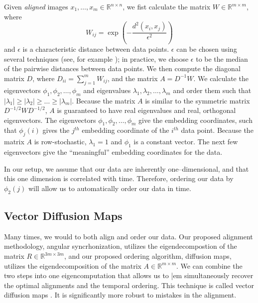 \documentclass[12pt]{article}
\begin{document}
Given {\em aligned} images $x_1, \dots, x_m \in \mathbb{R}^{n \times n}$, we fist calculate the matrix $W \in \mathbb{R}^{m \times m}$, where 
\begin{equation}
W_{ij} = \exp \left( -\frac{d^2(x_i, x_j)}{\epsilon^2} \right)
\end{equation}
and $\epsilon$ is a characteristic distance between data points.
%
$\epsilon$ can be chosen using several techniques (see, for example \cite{coifman2008graph}); in practice, we choose $\epsilon$ to be the median of the pairwise distances between data points.
%
We then compute the diagonal matrix $D$, where $D_{ii} = \sum_{j=1}^{m} W_{ij}$, and the matrix $A = D^{-1} W$. 
%
We calculate the eigenvectors $\phi_1, \phi_2, \dots, \phi_m$ and eigenvalues $\lambda_1, \lambda_2, \dots, \lambda_m$ and order them such that $|\lambda_1| \ge |\lambda_2| \ge \dots \ge |\lambda_m|$. 
%
Because the matrix $A$ is similar to the symmetric matrix $D^{-1/2} W D^{-1/2}$, $A$ is guaranteed to have real eigenvalues and real, orthogonal eigenvectors. 
%
The eigenvectors $\phi_1, \phi_2, \dots, \phi_m$ give the embedding coordinates, such that $\phi_j(i)$ gives the $j^{th}$ embedding coordinate of the $i^{th}$ data point. 
%
Because the matrix $A$ is row-stochastic, $\lambda_1=1$ and $\phi_1$ is a constant vector.
%
The next few eigenvectors give the ``meaningful'' embedding coordinates for the data. 

In our setup, we assume that our data are inherently one--dimensional, and that this one dimension is correlated with time.
%
Therefore, ordering our data by $\phi_2(j)$ will allow us to automatically order our data in time. 

\subsection{Vector Diffusion Maps}

Many times, we would to both align and order our data.
%
Our proposed alignment methodology, angular syncrhonization, utilizes the eigendecompostion of the matrix $R \in \mathbb{R}^{3m \times 3m}$, and our proposed ordering algorithm, diffusion maps, utilizes the eigendecomposition of the matrix $A \in \mathbb{R}^{m \times m}$.
%
We can combine the two steps into one eigencomputation that allows us to {|em simultaneously} recover the optimal alignments and the temporal ordering.
%
This technique is called vector diffusion maps \cite{singer2012vector}.
%
It is significantly more robust to mistakes in the alignment.
\end{document}
